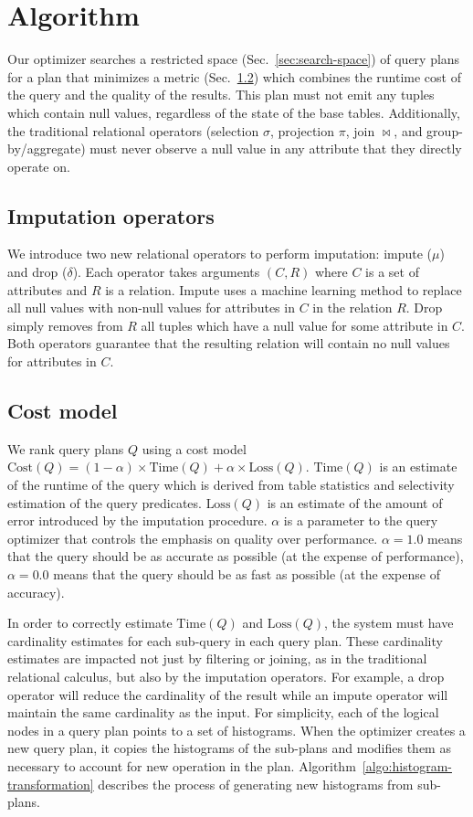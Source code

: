 \section{Algorithm}

Our optimizer searches a restricted space (Sec.~\ref{sec:search-space}) of query plans for a plan that minimizes a metric (Sec.~\ref{sec:cost-model}) which combines the runtime cost of the query and the quality of the results.
This plan must not emit any tuples which contain null values, regardless of the state of the base tables.
Additionally, the traditional relational operators (selection $\sigma$, projection $\pi$, join $\bowtie$, and group-by/aggregate) must never observe a null value in any attribute that they directly operate on.

\subsection{Imputation operators}
We introduce two new relational operators to perform imputation: impute ($\mu$) and drop ($\delta$). Each operator takes arguments $(C, R)$ where $C$ is a set of attributes and $R$ is a relation. Impute uses a machine learning method to replace all null values with non-null values for attributes in $C$ in the relation $R$. Drop simply removes from $R$ all tuples which have a null value for some attribute in $C$. Both operators guarantee that the resulting relation will contain no null values for attributes in $C$. 

\subsection{Cost model}
\label{sec:cost-model}
We rank query plans $Q$ using a cost model $\text{Cost}(Q) = (1 - \alpha) \times \text{Time}(Q) + \alpha \times \text{Loss}(Q)$. $\text{Time}(Q)$ is an estimate of the runtime of the query which is derived from table statistics and selectivity estimation of the query predicates. $\text{Loss}(Q)$ is an estimate of the amount of error introduced by the imputation procedure. $\alpha$ is a parameter to the query optimizer that controls the emphasis on quality over performance. $\alpha = 1.0$ means that the query should be as accurate as possible (at the expense of performance), $\alpha=0.0$ means that the query should be as fast
as possible (at the expense of accuracy).

In order to correctly estimate $\text{Time}(Q)$ and $\text{Loss}(Q)$, the system must have cardinality estimates
for each sub-query in each query plan.
These cardinality estimates are impacted not just by filtering or joining, as in the traditional relational calculus, but also by the imputation operators.
For example, a drop operator will reduce the cardinality of the result while an impute operator will maintain the same cardinality as the input.
For simplicity, each of the logical nodes in a query plan points to a set of histograms.
When the optimizer creates a new query plan, it copies the histograms of the sub-plans and modifies them as necessary to account for new operation in the plan.
Algorithm~\ref{algo:histogram-transformation} describes the process of generating new histograms from sub-plans.

